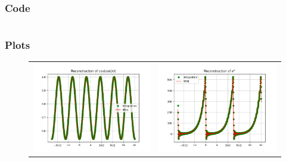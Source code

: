 \documentclass[11pt, a4paper, twoside]{article}
\begin{document}
            \subsubsection{Code}
                \inputminted[linenos, breaklines]{python}{Code/q7.py}
            \subsubsection{Plots}
                \begin{figure}[H]
                    \begin{tabular}{cc}
                        \includegraphics[scale=0.5]{Plots/Figure 7.png} &
                        \includegraphics[scale=0.5]{Plots/Figure 8.png}\\
                    \end{tabular}
                \end{figure}
\end{document}
